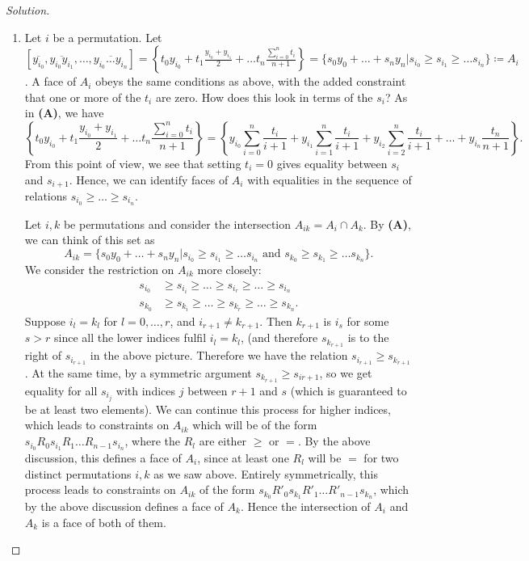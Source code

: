 \begin{proof}[Solution]
\begin{enumerate}[font=\scshape,label=\textbf{(\Alph*)}, wide]
\item Let $i$ be a permutation. Let $[\overline{y_{i_0}}, \overline{y_{i_0}y_{i_1}}, \ldots , \overline{y_{i_0}\ldots y_{i_n}}] = \left\{t_0 y_{i_0} + t_1 \frac{y_{i_0} + y_{i_1} }{2} + \ldots t_n\frac{\sum_{i=0}^n t_i}{n+1}\right\} = \{s_0 y_0 + \ldots + s_n y_n | s_{i_0} \geq s_{i_1} \geq \ldots s_{i_n} \} \coloneqq A_i$.
A face of $A_i$ obeys the same conditions as above, with the added constraint that one or more of the $t_i$ are zero. How does this look in terms of the $s_i$? As in \textbf{(A)}, we have
\[
\left\{t_0 y_{i_0} + t_1 \frac{y_{i_0} + y_{i_1} }{2} + \ldots t_n\frac{\sum_{i=0}^n t_i}{n+1}\right\} = \left\{y_{i_0}\sum_{i = 0}^n\frac{t_i}{i+1} + y_{i_1} \sum_{i = 1}^n\frac{t_i}{i+1} +y_{i_2} \sum_{i = 2}^n\frac{t_i}{i+1} + \ldots + y_{i_n}\frac{t_n}{n+1}\right\}.
\]
From this point of view, we see that setting $t_i = 0$ gives equality between $s_i$ and $s_{i+1}$. Hence, we can identify faces of $A_i$ with equalities in the sequence of relations $s_{i_0} \geq \ldots \geq s_{i_n}$.

Let $i, k$ be permutations and consider the intersection $A_{ik} = A_i\cap A_k$. By \textbf{(A)}, we can think of this set as
\[
A_{ik} = \{s_0 y_0 + \ldots + s_n y_n | s_{i_0} \geq s_{i_1} \geq \ldots s_{i_n} \text{ and }  s_{k_0} \geq s_{k_1} \geq \ldots s_{k_n}\}.
\]
We consider the restriction on $A_{ik}$ more closely:
\[
\begin{aligned}
s_{i_0} &\geq s_{i_i} \geq \ldots \geq s_{i_r} \geq \ldots \geq s_{i_n} \\
s_{k_0} &\geq s_{k_i} \geq \ldots \geq s_{k_r} \geq \ldots \geq s_{k_n}.
\end{aligned}
\]
 Suppose $i_l = k_l$ for $l = 0,\ldots, r$, and $i_{r+1} \neq k_{r+1}$. Then $k_{r+1}$ is $i_s$ for some $s>r$ since all the lower indices fulfil $i_l = k_l$, (and therefore $s_{k_{r+1}}$ is to the right of $s_{i_{r+1}}$ in the above picture. Therefore we have the relation $s_{i_{r+1}} \geq s_{k_{r+1}}$. At the same time, by a symmetric argument $s_{k_{r+1}} \geq s_{i{r+1}}$, so we get equality for all $s_{i_j}$ with indices $j$ between $r+1$ and $s$ (which is guaranteed to be at least two elements). We can continue this process for higher indices, which leads to constraints on $A_{ik}$ which will be of the form $s_{i_0} R_0 s_{i_1} R_{1} \ldots R_{n-1} s_{i_n}$, where the $R_l$ are either $\geq$ or $=$. By the above discussion, this defines a face of $A_i$, since at least one $R_l$ will be $=$ for two distinct permutations $i, k$ as we saw above. Entirely symmetrically, this process leads to constraints on $A_{ik}$ of the form $s_{k_0} R'_0 s_{k_1} R'_{1} \ldots R'_{n-1} s_{k_n}$, which by the above discussion defines a face of $A_k$. Hence the intersection of $A_i$ and $A_k$ is a face of both of them.



\end{enumerate}
\end{proof}

